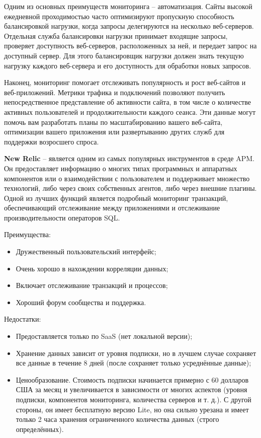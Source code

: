 Одним из основных преимуществ мониторинга – автоматизация. Сайты высокой ежедневной проходимостью часто оптимизируют пропускную способность балансировкой нагрузки, когда запросы делегируются на несколько веб-серверов. Отдельная служба балансировки нагрузки принимает входящие запросы, проверяет доступность веб-серверов, расположенных за ней, и передает запрос на доступный сервер. Для этого балансировщик нагрузки должен знать текущую нагрузку каждого веб-сервера и его доступность для обработки новых запросов.

Наконец, мониторинг помогает отслеживать популярность и рост веб-сайтов и веб-приложений. Метрики трафика и подключений позволяют получить непосредственное представление об активности сайта, в том числе о количестве активных пользователей и продолжительности каждого сеанса. Эти данные могут помочь вам разработать планы по масштабированию вашего веб-сайта, оптимизации вашего приложения или развертыванию других служб для поддержки возросшего спроса.

\textbf{New Relic} – является одним из самых популярных инструментов в среде APM. Он предоставляет информацию о многих типах программных и аппаратных компонентов или о взаимодействии с пользователем и поддерживает множество технологий, либо через своих собственных агентов, либо через внешние плагины. Одной из лучших функций является подробный мониторинг транзакций, обеспечивающий отслеживание между приложениями и отслеживание производительности операторов SQL. \cite{NewRelic78:online}

Преимущества:
\begin{itemize}
	\item Дружественный пользовательский интерфейс;
	\item Очень хорошо в нахождении корреляции данных;
	\item Включает отслеживание транзакций и процессов;
	\item Хороший форум сообщества и поддержка.
\end{itemize}

Недостатки:
\begin{itemize}
	\item Предоставляется только по SaaS (нет локальной версии);
	\item Хранение данных зависит от уровня подписки, но в лучшем случае сохраняет все данные в течение 8 дней (после сохраняет только усреднённые данные);
	\item Ценообразование. Стоимость подписки начинается примерно с 60 долларов США за месяц и увеличивается в зависимости от многих аспектов (уровня подписки, компонентов мониторинга, количества серверов и т. д.). С другой стороны, он имеет бесплатную версию Lite, но она сильно урезана и имеет только 2 часа хранения ограниченного количества данных (строго определённых).
\end{itemize}

